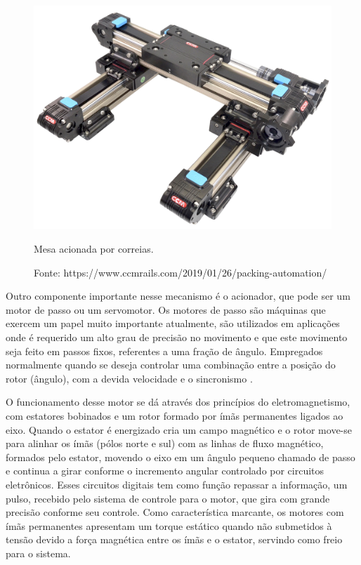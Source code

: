 \begin{figure}[h]
\centering
\includegraphics[scale = 0.065]{figuras/mcorreia}
\caption{Mesa acionada por correias.}
\caption*{Fonte: https://www.ccmrails.com/2019/01/26/packing-automation/}
\label{fig:mcorreia}
\end{figure}
    
Outro componente importante nesse mecanismo é o acionador, que pode ser um motor de passo ou um servomotor. 
Os motores de passo são máquinas que exercem um papel muito importante atualmente, são utilizados em 
aplicações onde é requerido um alto grau de precisão no movimento e que este movimento seja feito em passos 
fixos, referentes a uma fração de ângulo. Empregados normalmente quando se deseja controlar uma combinação 
entre a posição do rotor (ângulo), com a devida velocidade e o sincronismo \cite{silva2018maquinas}.

O funcionamento desse motor se dá através dos princípios do eletromagnetismo, com estatores bobinados e um rotor 
formado por ímãs permanentes ligados ao eixo. Quando o estator é energizado cria um campo magnético e o rotor 
move-se para alinhar os ímãs (pólos norte e sul) com as linhas de fluxo magnético, formados pelo estator, 
movendo o eixo em um ângulo pequeno chamado de passo e continua a girar conforme o incremento angular controlado 
por circuitos eletrônicos. Esses circuitos digitais tem como função repassar a informação, um pulso, recebido 
pelo sistema de controle para o motor, que gira com grande precisão conforme seu controle. Como característica 
marcante, os motores com ímãs permanentes apresentam um torque estático quando não submetidos à tensão devido 
a força magnética entre os ímãs e o estator, servindo como freio para o sistema.
 
